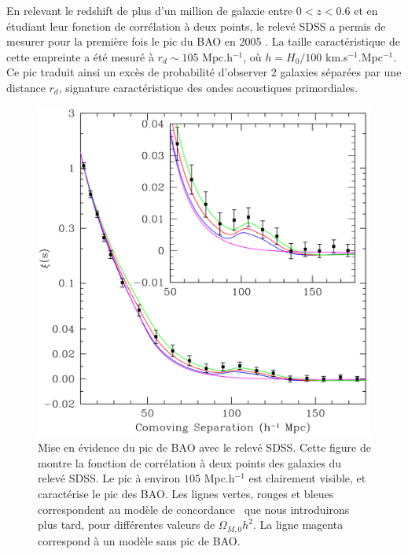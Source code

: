 \documentclass[../main/main.tex]{subfiles}
\begin{document}
En relevant le redshift de plus d'un million de galaxie entre $0<z<0.6$
et en étudiant leur fonction de corrélation à deux points,
le relevé SDSS \citep{YorkSDSS2000} a permis de mesurer pour la première fois le pic du BAO
en 2005 \citep[Figure~\ref{fig:baopeak};][]{Eisenstein}. La
taille caractéristique de cette empreinte a été mesuré à $r_{d}\sim105$
Mpc.h$^{-1}$, où $h=H_{0}/100$ km.s$^{-1}$.Mpc$^{-1}$. Ce pic traduit ainsi un excès de probabilité d'observer 2 galaxies
séparées par une distance $r_{d}$, signature caractéristique des ondes
acoustiques primordiales. 


\begin{figure}[ht]
  
  \begin{minipage}[c]{0.42\textwidth}
    \caption[Mise en évidence du pic de BAO avec le relevé SDSS.]{Mise en
      évidence du pic de BAO avec le relevé SDSS. Cette figure de
      \citet{Eisenstein} montre la fonction de corrélation à deux points
      des galaxies du relevé SDSS. Le pic à environ $105$ Mpc.h$^{-1}$ est
      clairement visible, et caractérise le pic des BAO. Les lignes vertes,
      rouges et bleues correspondent au modèle de concordance \lcdm\, que
      nous introduirons plus tard, pour différentes valeurs de
      $\Omega_{M,0}h^{2}$. La ligne magenta correspond à un modèle sans
      pic de BAO.}\label{fig:baopeak}
    \end{minipage}
    \begin{minipage}[c]{0.55\textwidth}
      \includegraphics[width=\textwidth]{../figures/01_cosmology/BAOpeak.pdf}
    \end{minipage}\hfill
  
\end{figure}
\end{document}
